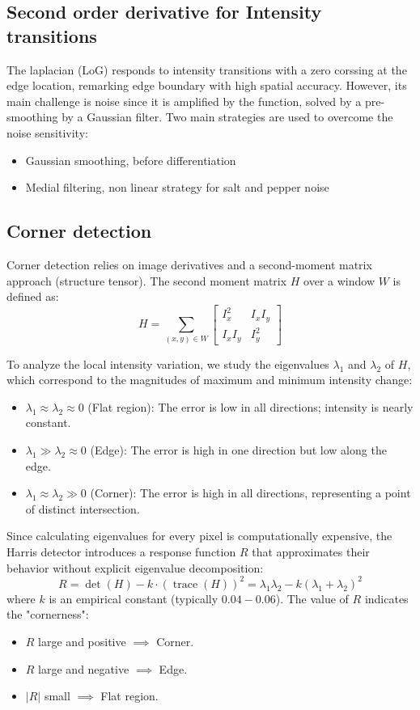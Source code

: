 \subsection{Second order derivative for Intensity transitions}
The laplacian (LoG) responds to intensity transitions with a zero corssing at the edge location, remarking edge boundary with high spatial accuracy.
However, its main challenge is noise since it is amplified by the function, solved by a pre-smoothing by a Gaussian filter.
Two main strategies are used to overcome the noise sensitivity:
\begin{itemize}
    \item Gaussian smoothing, before differentiation
    \item Medial filtering, non linear strategy for salt and pepper noise
\end{itemize}

\subsection{Corner detection}
Corner detection relies on image derivatives and a second-moment matrix approach (structure tensor). The second moment matrix $H$ over a window $W$ is defined as:
\[
  H = \sum_{(x,y) \in W} \begin{bmatrix} I_x^2 & I_x I_y \\ I_x I_y & I_y^2 \end{bmatrix}
\]

To analyze the local intensity variation, we study the eigenvalues $\lambda_1$ and $\lambda_2$ of $H$, which correspond to the magnitudes of maximum and minimum intensity change:
\begin{itemize}
    \item $\lambda_1 \approx \lambda_2 \approx 0$ (Flat region): The error is low in all directions; intensity is nearly constant.
    \item $\lambda_1 \gg \lambda_2 \approx 0$ (Edge): The error is high in one direction but low along the edge.
    \item $\lambda_1 \approx \lambda_2 \gg 0$ (Corner): The error is high in all directions, representing a point of distinct intersection.
\end{itemize}

Since calculating eigenvalues for every pixel is computationally expensive, the Harris detector introduces a response function $R$ that approximates their behavior without explicit eigenvalue decomposition:
\[
  R = \det(H) - k \cdot (\operatorname{trace}(H))^2 = \lambda_1 \lambda_2 - k(\lambda_1 + \lambda_2)^2
\]
where $k$ is an empirical constant (typically $0.04 - 0.06$). The value of $R$ indicates the "cornerness":
\begin{itemize}
    \item $R$ large and positive $\implies$ Corner.
    \item $R$ large and negative $\implies$ Edge.
    \item $|R|$ small $\implies$ Flat region.
\end{itemize}

